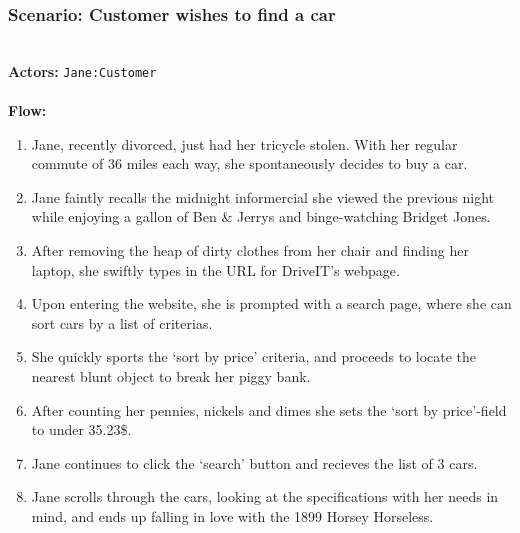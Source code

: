 \subsubsection{Scenario: Customer wishes to find a car}
\HRule \\[0.4cm]
\textbf{Actors:} \texttt{Jane:Customer}\\
\HRule \\[0.4cm]
\textbf{Flow:} \\
\begin{enumerate}
 \item Jane, recently divorced, just had her tricycle stolen. With her regular commute of 36 miles each way, she spontaneously decides to buy a car.
 \item Jane faintly recalls the midnight informercial she viewed the previous night while enjoying a gallon of Ben \& Jerrys and binge-watching Bridget Jones.
 \item After removing the heap of dirty clothes from her chair and finding her laptop, she swiftly types in the URL for DriveIT's webpage.
 \item Upon entering the website, she is prompted with a search page, where she can sort cars by a list of criterias.
 \item She quickly sports the `sort by price' criteria, and proceeds to locate the nearest blunt object to break her piggy bank.
 \item After counting her pennies, nickels and dimes she sets the `sort by price'-field to under 35.23\$.
 \item Jane continues to click the `search' button and recieves the list of 3 cars.
 \item Jane scrolls through the cars, looking at the specifications with her needs in mind, and ends up falling in love with the 1899 Horsey Horseless.
\end{enumerate}
\HRule \\[0.4cm]
